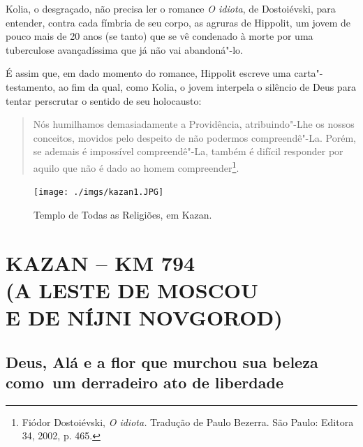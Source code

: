 Kolia, o desgraçado, não precisa ler o romance \emph{O idiota}, de
Dostoiévski, para entender, contra cada fímbria de seu corpo, as agruras
de Hippolit, um jovem de pouco mais de 20 anos (se tanto) que se vê
condenado à morte por uma tuberculose avançadíssima que já não vai
abandoná"-lo.

É assim que, em dado momento do romance, Hippolit escreve uma
carta"-testamento, ao fim da qual, como Kolia, o jovem interpela o
silêncio de Deus para tentar perscrutar o sentido de seu holocausto:

\begin{quote}
Nós humilhamos demasiadamente a Providência, atribuindo"-Lhe os nossos
conceitos, movidos pelo despeito de não podermos compreendê"-La. Porém,
se ademais é impossível compreendê"-La, também é difícil responder por
aquilo que não é dado ao homem compreender\footnote{Fiódor Dostoiévski,
  \emph{O idiota.} Tradução de Paulo Bezerra. São Paulo: Editora 34,
  2002, p. 465.}.
\end{quote}

\pagebreak
\clearpage
\thispagestyle{empty}

\movetoevenpage
\begin{absolutelynopagebreak}
\begin{vplace}
\begin{figure}[H]
\begin{adjustwidth}{-2.7cm}{}
  \vspace{3cm}
  \hspace{0.3cm}
  \texttt{[image: ./imgs/kazan1.JPG]}  
\end{adjustwidth}
  \caption{Templo de Todas as Religiões, em Kazan.}

\thispagestyle{empty}

\end{figure}
\end{vplace}

\end{absolutelynopagebreak}

\movetooddpage
{}
\part*{KAZAN -- KM 794\\(A LESTE DE MOSCOU\\E DE NÍJNI NOVGOROD)}


\chapter*{Deus, Alá e a flor que murchou sua beleza como~um derradeiro ato de liberdade}

